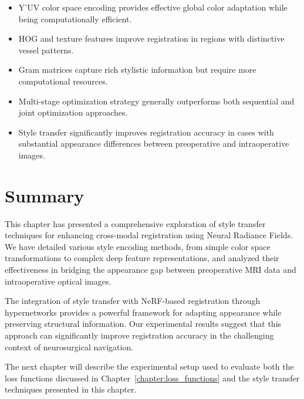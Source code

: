 \begin{itemize}
    \item Y'UV color space encoding provides effective global color adaptation while being computationally efficient.
    
    \item HOG and texture features improve registration in regions with distinctive vessel patterns.
    
    \item Gram matrices capture rich stylistic information but require more computational resources.
    
    \item Multi-stage optimization strategy generally outperforms both sequential and joint optimization approaches.
    
    \item Style transfer significantly improves registration accuracy in cases with substantial appearance differences between preoperative and intraoperative images.
\end{itemize}

\section{Summary}

This chapter has presented a comprehensive exploration of style transfer techniques for enhancing cross-modal registration using Neural Radiance Fields. We have detailed various style encoding methods, from simple color space transformations to complex deep feature representations, and analyzed their effectiveness in bridging the appearance gap between preoperative MRI data and intraoperative optical images.

The integration of style transfer with NeRF-based registration through hypernetworks provides a powerful framework for adapting appearance while preserving structural information. Our experimental results suggest that this approach can significantly improve registration accuracy in the challenging context of neurosurgical navigation.

The next chapter will describe the experimental setup used to evaluate both the loss functions discussed in Chapter~\ref{chapter:loss_functions} and the style transfer techniques presented in this chapter. 